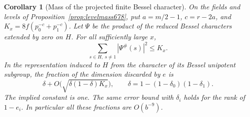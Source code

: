 \documentclass[a4paper,11pt]{article}
\newtheorem{corollary}[proposition]{Corollary}
\theoremstyle{definition}
\theoremstyle{remark}
\numberwithin{equation}{section}
\begin{document}
\begin{corollary}[Mass of the projected finite Bessel character]
\leavevmode\label{cor:markedbessel679}
On the fields and levels of Proposition~\ref{prop:levelmass678},
put \(a=m/2-1\), \(c=r-2a\), and
\(K_x=8f(p_0^{-c}+p_1^{-c})\). Let \(\Psi\) be the product of
the reduced Bessel characters extended by zero on \(H\).
For all sufficiently large \(x\),
\[
 \sum_{s\in H,\ s\ne1}|\Psi^\#(s)|^2\le K_x.
\]
In the representation induced to \(H\) from the character of
its Bessel unipotent subgroup, the fraction of the dimension
discarded by \(e\) is
\[
        \delta+O\big(\sqrt{\delta(1-\delta)K_x}\big),
        \qquad \delta=1-(1-\delta_0)(1-\delta_1).
\]
The implied constant is one. The same
error bound with \(\delta_i\) holds for the rank of
\(1-e_i\). In particular all these fractions are \(O(b^{-9})\).
\end{corollary}
\end{document}
